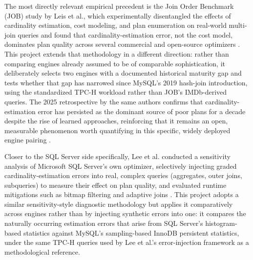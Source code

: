 \documentclass[conference]{IEEEtran}
\begin{document}
The most directly relevant empirical precedent is the Join Order Benchmark (JOB) study by Leis et al., which experimentally disentangled the effects of cardinality estimation, cost modeling, and plan enumeration on real-world multi-join queries and found that cardinality-estimation error, not the cost model, dominates plan quality across several commercial and open-source optimizers \cite{leis2015}. This project extends that methodology in a different direction: rather than comparing engines already assumed to be of comparable sophistication, it deliberately selects two engines with a documented historical maturity gap and tests whether that gap has narrowed since MySQL's 2019 hash-join introduction, using the standardized TPC-H workload rather than JOB's IMDb-derived queries. The 2025 retrospective by the same authors confirms that cardinality-estimation error has persisted as the dominant source of poor plans for a decade despite the rise of learned approaches, reinforcing that it remains an open, measurable phenomenon worth quantifying in this specific, widely deployed engine pairing \cite{leis2025}.

Closer to the SQL Server side specifically, Lee et al. conducted a sensitivity analysis of Microsoft SQL Server's own optimizer, selectively injecting graded cardinality-estimation errors into real, complex queries (aggregates, outer joins, subqueries) to measure their effect on plan quality, and evaluated runtime mitigations such as bitmap filtering and adaptive joins \cite{lee2023}. This project adopts a similar sensitivity-style diagnostic methodology but applies it comparatively across engines rather than by injecting synthetic errors into one: it compares the naturally occurring estimation errors that arise from SQL Server's histogram-based statistics against MySQL's sampling-based InnoDB persistent statistics, under the same TPC-H queries used by Lee et al.'s error-injection framework as a methodological reference.
\end{document}
